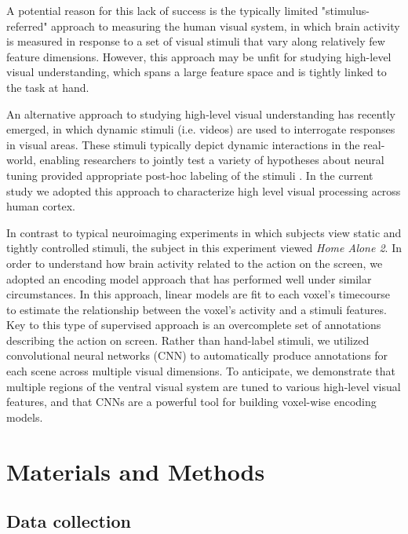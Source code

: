 \documentclass[10pt,twocolumn,letterpaper]{article}
\begin{document}
A potential reason for this lack of success is the typically limited "stimulus-referred" approach to measuring the human visual system, in which brain activity is measured in response to a set of visual stimuli that vary along relatively few feature dimensions. However, this approach may be unfit for studying high-level visual understanding, which spans a large feature space and is tightly linked to the task at hand.

An alternative approach to studying high-level visual understanding has recently emerged, in which dynamic stimuli (i.e. videos) are used to interrogate responses in visual areas. These stimuli typically depict dynamic interactions in the real-world, enabling researchers to jointly test a variety of hypotheses about neural tuning provided appropriate post-hoc labeling of the stimuli \cite{ccukur2013attention}. In the current study we adopted this approach to characterize high level visual processing across human cortex.

In contrast to typical neuroimaging experiments in which subjects view static and tightly controlled stimuli, the subject in this experiment viewed \textit{Home Alone 2}. In order to understand how brain activity related to the action on the screen, we adopted an encoding model approach that has performed well under similar circumstances. In this approach, linear models are fit to each voxel’s timecourse to estimate the relationship between the voxel’s activity and a stimuli features. Key to this type of supervised approach is an overcomplete set of annotations describing the action on screen. Rather than hand-label stimuli, we utilized convolutional neural networks (CNN) to automatically produce annotations for each scene across multiple visual dimensions. To anticipate, we demonstrate that multiple regions of the ventral visual system are tuned to various high-level visual features, and that CNNs are a powerful tool for building voxel-wise encoding models.


\section{Materials and Methods}

\subsection{Data collection}
\end{document}
